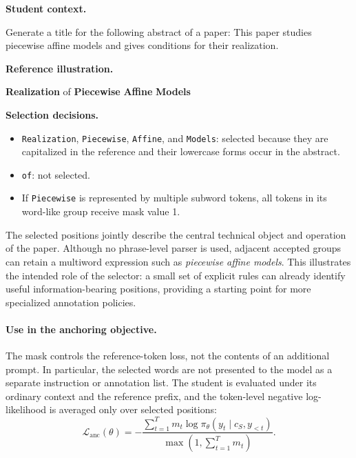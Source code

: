 \documentclass{article} %
\begin{document}
\begin{tcolorbox}[
    colback=gray!5,
    colframe=black!45,
    title={Case 3: Paper title generation---technical terminology},
    breakable,
    fontupper=\small
]
\textbf{Student context.}

Generate a title for the following abstract of a paper: This paper studies piecewise affine models and gives conditions for their realization.

\medskip
\textbf{Reference illustration.}

\textbf{Realization} of \textbf{Piecewise} \textbf{Affine} \textbf{Models}

\medskip
\textbf{Selection decisions.}
\begin{itemize}
    \item \texttt{Realization}, \texttt{Piecewise}, \texttt{Affine}, and \texttt{Models}: selected because they are capitalized in the reference and their lowercase forms occur in the abstract.
    \item \texttt{of}: not selected.
    \item If \texttt{Piecewise} is represented by multiple subword tokens, all tokens in its word-like group receive mask value 1.
\end{itemize}
\end{tcolorbox}

The selected positions jointly describe the central technical object and operation of the paper. Although no phrase-level parser is used, adjacent accepted groups can retain a multiword expression such as \emph{piecewise affine models}. This illustrates the intended role of the selector: a small set of explicit rules can already identify useful information-bearing positions, providing a starting point for more specialized annotation policies.

\paragraph{Use in the anchoring objective.}
The mask controls the reference-token loss, not the contents of an additional prompt. In particular, the selected words are not presented to the model as a separate instruction or annotation list. The student is evaluated under its ordinary context and the reference prefix, and the token-level negative log-likelihood is averaged only over selected positions:
\begin{equation}
\mathcal{L}_{\mathrm{anc}}(\theta)
=
-
\frac{
\sum_{t=1}^{T}
m_t\log\pi_{\theta}(y_t\mid c_S,y_{<t})
}{
\max\!\left(1,\sum_{t=1}^{T}m_t\right)
}.
\label{eq:focal_masked_anchoring}
\end{equation}
\end{document}
